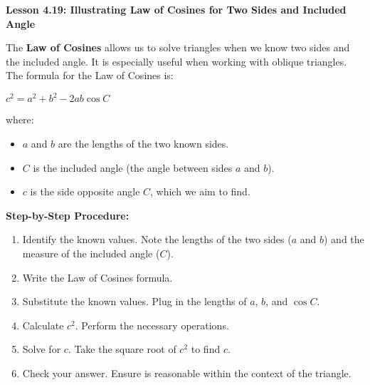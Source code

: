 \begin{center}
\textbf{Lesson 4.19: Illustrating Law of Cosines for Two Sides and Included Angle}
\end{center}

\vspace*{-1.5ex}

The \textbf{Law of Cosines} allows us to solve triangles when we know two sides and the included angle. It is especially useful when working with oblique triangles. The formula for the Law of Cosines is:  

{\centering $
c^2 = a^2 + b^2 - 2ab \cos C
$\par}

\noindent where:
\begin{itemize}
    \item \(a\) and \(b\) are the lengths of the two known sides.
    \item \(C\) is the included angle (the angle between sides \(a\) and \(b\)).
    \item \(c\) is the side opposite angle \(C\), which we aim to find.
\end{itemize}

\noindent\textbf{Step-by-Step Procedure:}
\begin{enumerate}
    \item Identify the known values. Note the lengths of the two sides (\(a\) and \(b\)) and the measure of the included angle (\(C\)).
    \item Write the Law of Cosines formula. 
    \item Substitute the known values. Plug in the lengths of \(a\), \(b\), and \(\cos C\).
    \item Calculate \(c^2\). Perform the necessary operations.
    \item Solve for \(c\). Take the square root of \(c^2\) to find \(c\).
    \item Check your answer. Ensure is reasonable within the context of the triangle.
\end{enumerate}
